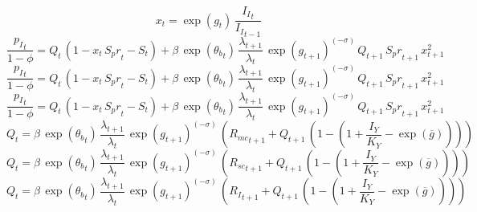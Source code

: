 \begin{dmath}
{{x}}_{t}=\exp\left({{g}}_{t}\right)\, \frac{{{I_I}}_{t}}{{{I_I}}_{t-1}}
\end{dmath}
\begin{dmath}
\frac{{{p_I}}_{t}}{1-{{\phi}}}={{Q}}_{t}\, \left(1-{{x}}_{t}\, {S_pr}_{t}-{S}_{t}\right)+{{\beta}}\, \exp\left({{\theta_b}}_{t}\right)\, \frac{{{\lambda}}_{t+1}}{{{\lambda}}_{t}}\, \exp\left({{g}}_{t+1}\right)^{\left(-{{\sigma}}\right)}\, {{Q}}_{t+1}\, {S_pr}_{t+1}\, {{x}}_{t+1}^{2}
\end{dmath}
\begin{dmath}
\frac{{{p_I}}_{t}}{1-{{\phi}}}={{Q}}_{t}\, \left(1-{{x}}_{t}\, {S_pr}_{t}-{S}_{t}\right)+{{\beta}}\, \exp\left({{\theta_b}}_{t}\right)\, \frac{{{\lambda}}_{t+1}}{{{\lambda}}_{t}}\, \exp\left({{g}}_{t+1}\right)^{\left(-{{\sigma}}\right)}\, {{Q}}_{t+1}\, {S_pr}_{t+1}\, {{x}}_{t+1}^{2}
\end{dmath}
\begin{dmath}
\frac{{{p_I}}_{t}}{1-{{\phi}}}={{Q}}_{t}\, \left(1-{{x}}_{t}\, {S_pr}_{t}-{S}_{t}\right)+{{\beta}}\, \exp\left({{\theta_b}}_{t}\right)\, \frac{{{\lambda}}_{t+1}}{{{\lambda}}_{t}}\, \exp\left({{g}}_{t+1}\right)^{\left(-{{\sigma}}\right)}\, {{Q}}_{t+1}\, {S_pr}_{t+1}\, {{x}}_{t+1}^{2}
\end{dmath}
\begin{dmath}
{{Q}}_{t}={{\beta}}\, \exp\left({{\theta_b}}_{t}\right)\, \frac{{{\lambda}}_{t+1}}{{{\lambda}}_{t}}\, \exp\left({{g}}_{t+1}\right)^{\left(-{{\sigma}}\right)}\, \left({{R_{mc}}}_{t+1}+{{Q}}_{t+1}\, \left(1-\left(1+\frac{{{I_Y}}}{{{K_Y}}}-\exp\left({{\overline{g}}}\right)\right)\right)\right)
\end{dmath}
\begin{dmath}
{{Q}}_{t}={{\beta}}\, \exp\left({{\theta_b}}_{t}\right)\, \frac{{{\lambda}}_{t+1}}{{{\lambda}}_{t}}\, \exp\left({{g}}_{t+1}\right)^{\left(-{{\sigma}}\right)}\, \left({{R_{sc}}}_{t+1}+{{Q}}_{t+1}\, \left(1-\left(1+\frac{{{I_Y}}}{{{K_Y}}}-\exp\left({{\overline{g}}}\right)\right)\right)\right)
\end{dmath}
\begin{dmath}
{{Q}}_{t}={{\beta}}\, \exp\left({{\theta_b}}_{t}\right)\, \frac{{{\lambda}}_{t+1}}{{{\lambda}}_{t}}\, \exp\left({{g}}_{t+1}\right)^{\left(-{{\sigma}}\right)}\, \left({{R_I}}_{t+1}+{{Q}}_{t+1}\, \left(1-\left(1+\frac{{{I_Y}}}{{{K_Y}}}-\exp\left({{\overline{g}}}\right)\right)\right)\right)
\end{dmath}
